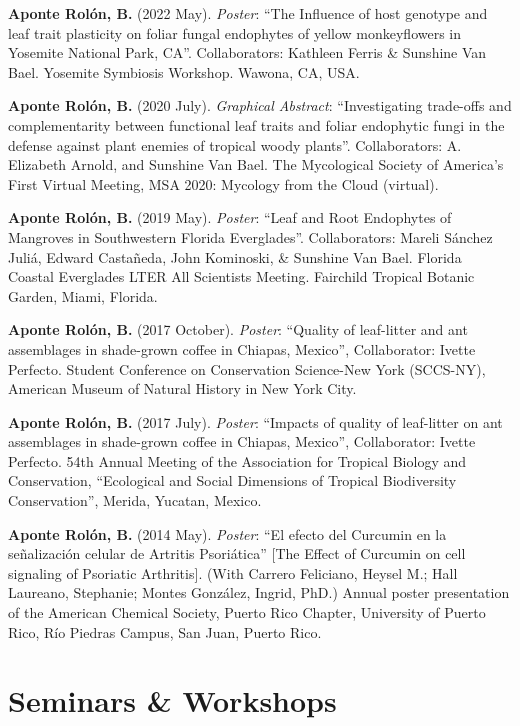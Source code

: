 \documentclass[11pt,a4paper,]{awesome-cv}
\begin{document}
\textbf{Aponte Rolón, B.} (2022 May). \emph{Poster}: ``The Influence of
host genotype and leaf trait plasticity on foliar fungal endophytes of
yellow monkeyflowers in Yosemite National Park, CA''. Collaborators:
Kathleen Ferris \& Sunshine Van Bael. Yosemite Symbiosis Workshop.
Wawona, CA, USA.

\textbf{Aponte Rolón, B.} (2020 July). \emph{Graphical Abstract}:
``Investigating trade-offs and complementarity between functional leaf
traits and foliar endophytic fungi in the defense against plant enemies
of tropical woody plants''. Collaborators: A. Elizabeth Arnold, and
Sunshine Van Bael. The Mycological Society of America's First Virtual
Meeting, MSA 2020: Mycology from the Cloud (virtual).

\textbf{Aponte Rolón, B.} (2019 May). \emph{Poster}: ``Leaf and Root
Endophytes of Mangroves in Southwestern Florida Everglades''.
Collaborators: Mareli Sánchez Juliá, Edward Castañeda, John Kominoski,
\& Sunshine Van Bael. Florida Coastal Everglades LTER All Scientists
Meeting. Fairchild Tropical Botanic Garden, Miami, Florida.

\textbf{Aponte Rolón, B.} (2017 October). \emph{Poster}: ``Quality of
leaf-litter and ant assemblages in shade-grown coffee in Chiapas,
Mexico'', Collaborator: Ivette Perfecto. Student Conference on
Conservation Science-New York (SCCS-NY), American Museum of Natural
History in New York City.

\textbf{Aponte Rolón, B.} (2017 July). \emph{Poster}: ``Impacts of
quality of leaf-litter on ant assemblages in shade-grown coffee in
Chiapas, Mexico'', Collaborator: Ivette Perfecto. 54th Annual Meeting of
the Association for Tropical Biology and Conservation, ``Ecological and
Social Dimensions of Tropical Biodiversity Conservation'', Merida,
Yucatan, Mexico.

\textbf{Aponte Rolón, B.} (2014 May). \emph{Poster}: ``El efecto del
Curcumin en la señalización celular de Artritis Psoriática'' {[}The
Effect of Curcumin on cell signaling of Psoriatic Arthritis{]}. (With
Carrero Feliciano, Heysel M.; Hall Laureano, Stephanie; Montes González,
Ingrid, PhD.) Annual poster presentation of the American Chemical
Society, Puerto Rico Chapter, University of Puerto Rico, Río Piedras
Campus, San Juan, Puerto Rico.

\hypertarget{seminars-workshops}{%
\section{Seminars \& Workshops}\label{seminars-workshops}}
\end{document}
